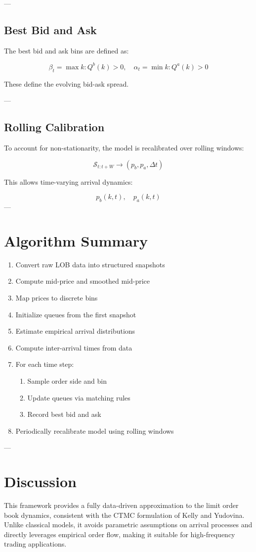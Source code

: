 \documentclass[12pt,a4paper]{report}
\begin{document}
---

\subsection{Best Bid and Ask}

The best bid and ask bins are defined as:

\[\beta_t = \max { k : Q^b(k) > 0 }, \quad
\alpha_t = \min { k : Q^a(k) > 0 }\]

These define the evolving bid-ask spread.

---

\subsection{Rolling Calibration}

To account for non-stationarity, the model is recalibrated over rolling windows:

\[
\mathcal{S}_{t:t+W} \rightarrow (p_b, p_a, \Delta t)
\]

This allows time-varying arrival dynamics:

\[
p_b(k,t), \quad p_a(k,t)
\]
---

\section{Algorithm Summary}

\begin{enumerate}
\item Convert raw LOB data into structured snapshots
\item Compute mid-price and smoothed mid-price
\item Map prices to discrete bins
\item Initialize queues from the first snapshot
\item Estimate empirical arrival distributions
\item Compute inter-arrival times from data
\item For each time step:
\begin{enumerate}
\item Sample order side and bin
\item Update queues via matching rules
\item Record best bid and ask
\end{enumerate}
\item Periodically recalibrate model using rolling windows
\end{enumerate}

---

\section{Discussion}

This framework provides a fully data-driven approximation to the limit order book dynamics, consistent with the CTMC formulation of Kelly and Yudovina. Unlike classical models, it avoids parametric assumptions on arrival processes and directly leverages empirical order flow, making it suitable for high-frequency trading applications.



\printbibliography
\end{document}
